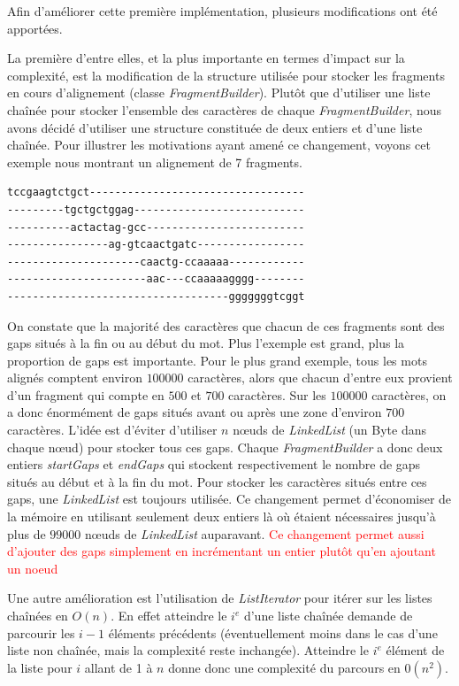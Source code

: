 \documentclass{article}
\begin{document}
Afin d'améliorer cette première implémentation, plusieurs modifications ont été apportées.

La première d'entre elles, et la plus importante en termes d'impact sur la complexité, est la modification de la structure utilisée pour stocker les fragments en cours d'alignement (classe \textit{FragmentBuilder}). Plutôt que d'utiliser une liste chaînée pour stocker l'ensemble des caractères de chaque \textit{FragmentBuilder}, nous avons décidé d'utiliser une structure constituée de deux entiers et d'une liste chaînée. Pour illustrer les motivations ayant amené ce changement, voyons cet exemple nous montrant un alignement de 7 fragments.

\begin{verbatim}
tccgaagtctgct----------------------------------
---------tgctgctggag---------------------------
----------actactag-gcc-------------------------
----------------ag-gtcaactgatc-----------------
---------------------caactg-ccaaaaa------------
----------------------aac---ccaaaaagggg--------
-----------------------------------gggggggtcggt
\end{verbatim}

On constate que la majorité des caractères que chacun de ces fragments sont des gaps situés à la fin ou au début du mot. Plus l'exemple est grand, plus la proportion de gaps est importante. Pour le plus grand exemple, tous les mots alignés comptent environ $100000$ caractères, alors que chacun d'entre eux provient d'un fragment qui compte en $500$ et $700$ caractères. Sur les $100000$ caractères, on a donc énormément de gaps situés avant ou après une zone d'environ $700$ caractères. L'idée est d'éviter d'utiliser $n$ nœuds de \textit{LinkedList} (un Byte dans chaque nœud) pour stocker tous ces gaps.
Chaque \textit{FragmentBuilder} a donc deux entiers \textit{startGaps} et \textit{endGaps} qui stockent respectivement le nombre de gaps situés au début et à la fin du mot. Pour stocker les caractères situés entre ces gaps, une \textit{LinkedList} est toujours utilisée. Ce changement permet d'économiser de la mémoire en utilisant seulement deux entiers là où étaient nécessaires jusqu'à plus de $99000$ nœuds de \textit{LinkedList} auparavant. 
\textcolor{red}{Ce changement permet aussi d'ajouter des gaps simplement en incrémentant un entier plutôt qu'en ajoutant un noeud}

Une autre amélioration est l'utilisation de \textit{ListIterator} pour itérer sur les listes chaînées en $O(n)$. En effet atteindre le $i^e$ d'une liste chaînée demande de parcourir les $i-1$ éléments précédents (éventuellement moins dans le cas d'une liste non chaînée, mais la complexité reste inchangée). Atteindre le $i^e$ élément de la liste pour $i$ allant de 1 à $n$ donne donc une complexité du parcours en $0(n^2)$.
\end{document}
